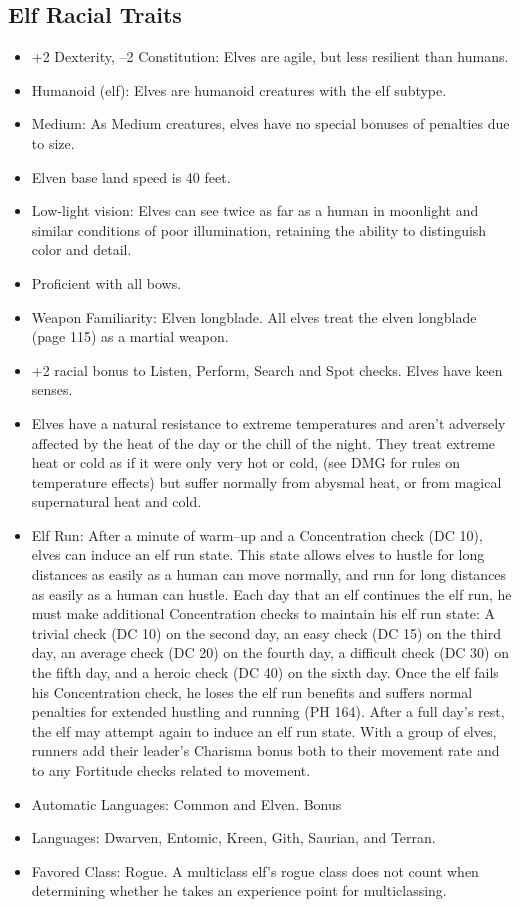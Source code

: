\documentclass[10pt,a4paper,twocolumn]{d20}
\begin{document}
\subsection{Elf Racial Traits}
\begin{itemize}
    \item +2 Dexterity, –2 Constitution: Elves are agile, but less resilient than humans.
    \item Humanoid (elf): Elves are humanoid creatures with the elf subtype.
    \item Medium: As Medium creatures, elves have no special bonuses of penalties due to size.
    \item Elven base land speed is 40 feet.
    \item Low‐light vision: Elves can see twice as far as a human in moonlight and similar conditions of poor illumination, retaining the ability to distinguish color and detail.
    \item Proficient with all bows.
    \item Weapon Familiarity: Elven longblade. All elves treat the elven longblade (page 115) as a martial weapon.
    \item +2 racial bonus to Listen, Perform, Search and Spot checks. Elves have keen senses.
    \item Elves have a natural resistance to extreme temperatures and aren’t adversely affected by the heat of the day or the chill of the night. They treat extreme heat or cold as if it were only very hot or cold, (see DMG for rules on temperature effects) but suffer normally from abysmal heat, or from magical supernatural heat and cold.
    \item Elf Run: After a minute of warm–up and a Concentration check (DC 10), elves can induce an elf run state. This state allows elves to hustle for long distances as easily as a human can move normally, and run for long distances as easily as a human can hustle. Each day that an elf continues the elf run, he must make additional Concentration checks to maintain his elf run state: A trivial check (DC 10) on the second day, an easy check (DC 15) on the third day, an average check (DC 20) on the fourth day, a difficult check (DC 30) on the fifth day, and a heroic check (DC 40) on the sixth day. Once the elf fails his Concentration check, he loses the elf run benefits and suffers normal penalties for extended hustling and running (PH 164). After a full day’s rest, the elf may attempt again to induce an elf run state. With a group of elves, runners add their leader’s Charisma bonus both to their movement rate and to any Fortitude checks related to movement.
    \item Automatic Languages: Common and Elven. Bonus
    \item Languages: Dwarven, Entomic, Kreen, Gith, Saurian, and Terran.
    \item Favored Class: Rogue. A multiclass elf’s rogue class does not count when determining whether he takes an experience point for multiclassing.
\end{itemize}
\end{document}
